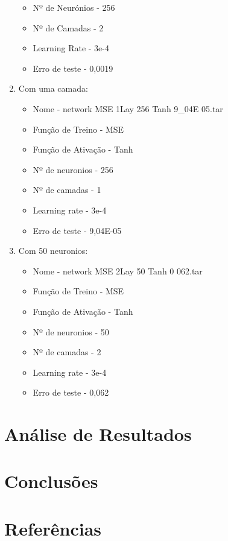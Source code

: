 \documentclass[10pt]{article}
\begin{document}
\begin{enumerate}
\begin{itemize}
    \item Nº de Neurónios - 256
    \item Nº de Camadas - 2
    \item Learning Rate - 3e-4
    \item Erro de teste - 0,0019
  \end{itemize}
  \vspace{1cm}
  \item Com uma camada:
    \begin{itemize}
      \item Nome - network MSE 1Lay 256 Tanh 9_04E 05.tar
      \item Função de Treino - MSE
      \item Função de Ativação - Tanh
      \item Nº de neuronios - 256
      \item Nº de camadas - 1
      \item Learning rate - 3e-4
      \item Erro de teste - 9,04E-05
    \end{itemize}  
    \vspace{1cm}
    \item Com 50 neuronios:
    \begin{itemize}
      \item Nome - network MSE 2Lay 50 Tanh 0 062.tar
      \item Função de Treino - MSE
      \item Função de Ativação - Tanh
      \item Nº de neuronios - 50
      \item Nº de camadas - 2
      \item Learning rate - 3e-4
      \item Erro de teste - 0,062
    \end{itemize}
\end{enumerate}
\newpage

\section{Análise de Resultados}\label{sec:ev-da-org}

\vspace{6cm}
\section{Conclusões}\label{sec:an-da-info-fin-da-org}

\vspace{3cm}

\newpage

\section{Referências}\label{sec:sup-inf-utl}


\nocite{Binance_2021}



\pagebreak
\end{document}
